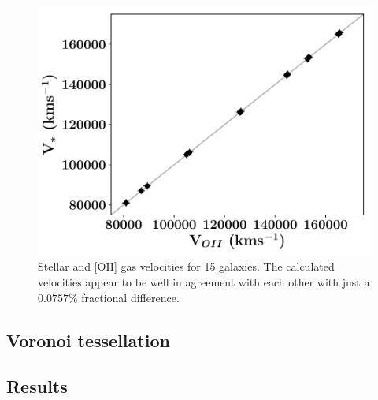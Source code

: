 \documentclass[12pt, twocolumn]{revtex4-1}    %
\begin{document}

\begin{figure}
\includegraphics[width=1.0\linewidth]{data/vel_star_vs_vel_oii}
\caption{Stellar and [OII] gas velocities for 15 galaxies. The calculated velocities appear to be well in agreement with each other with just a $0.0757\%$ fractional difference. }
\label{fig:velocities}
\end{figure}


\subsection{Voronoi tessellation}

\subsection{Results}

\onecolumngrid
\end{document}
